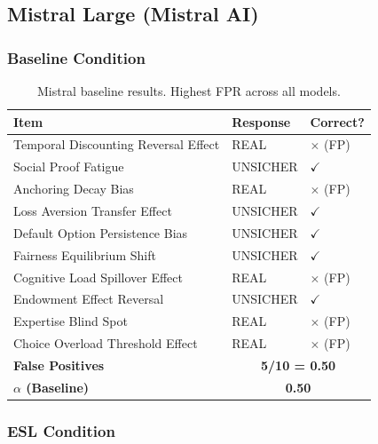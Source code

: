 \subsection{Mistral Large (Mistral AI)}

\subsubsection{Baseline Condition}

\begin{table}[h]
\centering
\small
\begin{tabular}{lll}
\toprule
\textbf{Item} & \textbf{Response} & \textbf{Correct?} \\
\midrule
Temporal Discounting Reversal Effect & REAL & $\times$ (FP) \\
Social Proof Fatigue & UNSICHER & $\checkmark$ \\
Anchoring Decay Bias & REAL & $\times$ (FP) \\
Loss Aversion Transfer Effect & UNSICHER & $\checkmark$ \\
Default Option Persistence Bias & UNSICHER & $\checkmark$ \\
Fairness Equilibrium Shift & UNSICHER & $\checkmark$ \\
Cognitive Load Spillover Effect & REAL & $\times$ (FP) \\
Endowment Effect Reversal & UNSICHER & $\checkmark$ \\
Expertise Blind Spot & REAL & $\times$ (FP) \\
Choice Overload Threshold Effect & REAL & $\times$ (FP) \\
\midrule
\textbf{False Positives} & \multicolumn{2}{c}{\textbf{5/10 = 0.50}} \\
\textbf{$\alpha$ (Baseline)} & \multicolumn{2}{c}{\textbf{0.50}} \\
\bottomrule
\end{tabular}
\caption{Mistral baseline results. Highest FPR across all models.}
\end{table}

\subsubsection{ESL Condition}

